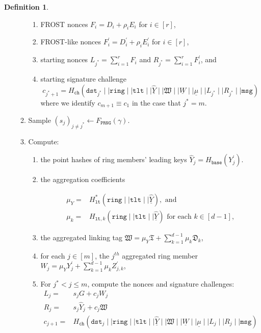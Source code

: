 \documentclass[11pt]{article}
\theoremstyle{definition}
\newtheorem{definition}[definition]{Definition}
\newcommand{\lt}{\texttt{lt}}
\newcommand{\tlt}{\texttt{tlt}}
\newcommand{\ring}{\texttt{ring}}
\newcommand{\msg}{\texttt{msg}}
\newcommand{\signaturequery}{(\texttt{dst}_{j} \mid \mid \ring \mid \mid \tlt \mid \mid \underline{\widehat{Y}} \mid \mid \mathfrak{W} \mid \mid \underline{W} \mid \mid \underline{\mu} \mid \mid L_{j} \mid \mid R_{j} \mid \mid \msg)}
\newcommand{\signaturequerystar}{(\texttt{dst}_{j^*} \mid \mid \ring \mid \mid \tlt \mid \mid \underline{\widehat{Y}} \mid \mid \mathfrak{W} \mid \mid \underline{W} \mid \mid \underline{\mu} \mid \mid L_{j^*} \mid \mid R_{j^*} \mid \mid \msg)}
\begin{document}
\begin{definition}
\begin{enumerate}
\begin{enumerate}
\begin{enumerate}
\item FROST nonces $F_i = D_i + \rho_i E_i$ for $i \in [r]$,
\item FROST-like nonces $F^\prime_i = D^\prime_i + \rho_i E^\prime_i$ for $i \in [r]$,

\item starting nonces $L_{j^*} = \sum_{i=1}^{r} F_i$ and $R_{j^*} = \sum_{i=1}^{r} F^\prime_i$, and
\item starting signature challenge \[c_{j^*+1} = H_{\texttt{ch}}\signaturequerystar\] where we identify $c_{m+1} \equiv c_1$ in the case that $j^* = m$.


\end{enumerate}

\item Sample $(s_j)_{j \neq j^*} \leftarrow F_{\texttt{PRNG}}(\gamma)$.


\item\label{step:commonstuff} Compute:
\begin{enumerate}

\item the point hashes of ring members' leading keys $\widehat{Y}_j = H_{\texttt{base}}(Y_j^\prime)$.

\item the aggregation coefficients

\begin{align*}
\mu_{Y} =& H_{\lt}^*(\ring  \mid \mid \tlt \mid \mid \underline{\widehat{Y}}), \text{ and} \\
\mu_{k} =& H_{\lt,k}(\ring \mid \mid \tlt \mid \mid \underline{\widehat{Y}})\text{ for each }k \in [d-1],
\end{align*}






\item the aggregated linking tag
$\mathfrak{W} = \mu_{Y} \mathfrak{T} + \sum_{k=1}^{d-1} \mu_{k} \mathfrak{D}_k$,



\item for each $j \in [m]$, the $j^{th}$ aggregated ring member $W_j = \mu_Y Y_j^\prime + \sum_{k=1}^{d-1} \mu_k Z_{j,k}^\prime$,




\item For $j^* < j \leq m$, compute the nonces and signature challenges:
\begin{align*}
L_j =& s_j G + c_j W_j \\ R_j =& s_j \widehat{Y}_j + c_j \mathfrak{W} \\
c_{j+1} =& H_{\texttt{ch}}\signaturequery %
\end{align*}


\end{enumerate}
\end{enumerate}
\end{enumerate}
\end{definition}
\end{document}
